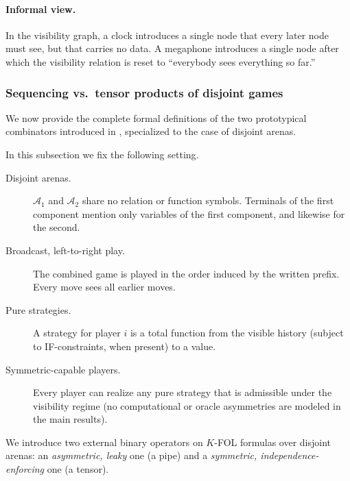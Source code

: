\paragraph{Informal view.}
In the visibility graph, a clock introduces a single node that every
later node must see, but that carries no data. A megaphone introduces a
single node after which the visibility relation is reset to ``everybody
sees everything so far.''

\subsubsection{Sequencing vs.\ tensor products of disjoint games}
\label{subsubsec:seq-vs-tensor}

We now provide the complete formal definitions of the two prototypical 
combinators introduced in , 
specialized to the case of disjoint arenas.

In this subsection we fix the following setting.
\begin{description}
  \item[Disjoint arenas.] $\mathcal A_1$ and $\mathcal A_2$ share no relation
  or function symbols. Terminals of the first component mention only variables
  of the first component, and likewise for the second.
  \item[Broadcast, left-to-right play.] The combined game is played in the
  order induced by the written prefix. Every move sees all earlier moves.
  \item[Pure strategies.] A strategy for player $i$ is a total function from
  the visible history (subject to IF-constraints, when present) to a value.
  \item[Symmetric-capable players.] Every player can realize any pure strategy
  that is admissible under the visibility regime (no computational or oracle
  asymmetries are modeled in the main results).
\end{description}

We introduce two external binary operators on $K$-FOL formulas over
disjoint arenas: an \emph{asymmetric, leaky} one (a pipe) and a
\emph{symmetric, independence-enforcing} one (a tensor).

\medskip

